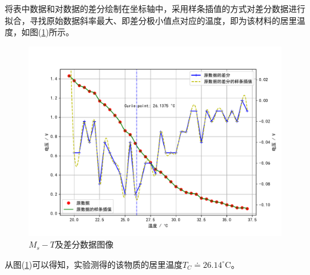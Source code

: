 \documentclass[a4paper]{article}
\begin{document}
将表中数据和对数据的差分绘制在坐标轴中，采用样条插值的方式对差分数据进行拟合，寻找原始数据斜率最大、即差分极小值点对应的温度，即为该材料的居里温度，如图(\ref{data:fig})所示。
\begin{figure}[!h]
\centering
\includegraphics[width=\textwidth]{fig/data.pdf}
\caption{$M_s - T$及差分数据图像}\label{data:fig}
\end{figure}

从图(\ref{data:fig})可以得知，实验测得的该物质的居里温度$T_C\doteq 26.14 ^{\circ}$C。
\end{document}
